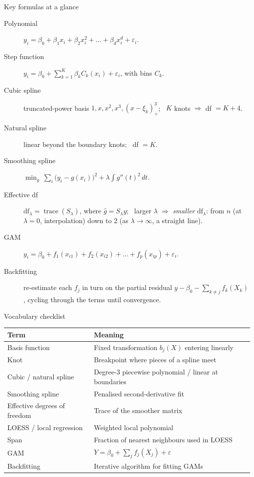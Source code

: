 \documentclass[aspectratio=169,11pt]{beamer}
\begin{document}
\begin{frame}{Key formulas at a glance}
  \footnotesize
  \begin{description}
    \item[Polynomial] $y_i=\beta_0+\beta_1 x_i+\beta_2 x_i^2+\dots+\beta_d x_i^d+\varepsilon_i$.
    \item[Step function] $y_i=\beta_0+\sum_{k=1}^{K}\beta_k C_k(x_i)+\varepsilon_i$, with bins $C_k$.
    \item[Cubic spline] truncated-power basis $1,x,x^2,x^3,(x-\xi_k)_+^3$; \ $K$ knots $\Rightarrow$ df $=K+4$.
    \item[Natural spline] linear beyond the boundary knots; \ df $=K$.
    \item[Smoothing spline] $\min_g\ \sum_i\big(y_i-g(x_i)\big)^2+\lambda\!\int g''(t)^2\,dt$.
    \item[Effective df] $\mathrm{df}_\lambda=\operatorname{trace}(S_\lambda)$, where $\hat g=S_\lambda y$; \ larger $\lambda$ $\Rightarrow$ \emph{smaller} $\mathrm{df}_\lambda$: from $n$ (at $\lambda=0$, interpolation) down to $2$ (as $\lambda\to\infty$, a straight line).
    \item[GAM] $y_i=\beta_0+f_1(x_{i1})+f_2(x_{i2})+\dots+f_p(x_{ip})+\varepsilon_i$.
    \item[Backfitting] re-estimate each $f_j$ in turn on the partial residual $y-\beta_0-\sum_{k\neq j}f_k(X_k)$, cycling through the terms until convergence.
  \end{description}
\end{frame}

\begin{frame}{Vocabulary checklist}
  \footnotesize
  \begin{tabular}{ll}
    \toprule
    \textbf{Term} & \textbf{Meaning} \\
    \midrule
    Basis function & Fixed transformation $b_j(X)$ entering linearly \\
    Knot & Breakpoint where pieces of a spline meet \\
    Cubic / natural spline & Degree-3 piecewise polynomial / linear at boundaries \\
    Smoothing spline & Penalised second-derivative fit \\
    Effective degrees of freedom & Trace of the smoother matrix \\
    LOESS / local regression & Weighted local polynomial \\
    Span & Fraction of nearest neighbours used in LOESS \\
    GAM & $Y = \beta_0 + \sum_j f_j(X_j) + \varepsilon$ \\
    Backfitting & Iterative algorithm for fitting GAMs \\
    \bottomrule
  \end{tabular}
\end{frame}
\end{document}
